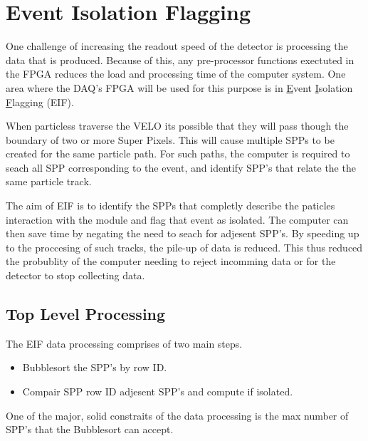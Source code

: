 \section{Event Isolation Flagging}
	
	One challenge of increasing the readout speed of the detector is processing the data that is produced.
	Because of this, any pre-processor functions exectuted in the FPGA reduces the load and processing time of the computer system.
	One area where the DAQ's FPGA will be used for this purpose is in \underline{E}vent \underline{I}solation \underline{F}lagging (EIF).
	\par
	When particless traverse the VELO its possible that they will pass though the boundary of two or more Super Pixels.
	This will cause multiple SPPs to be created for the same particle path.
	For such paths, the computer is required to seach all SPP corresponding to the event, and identify SPP's that relate the the same particle track.
	\par
	The aim of EIF is to identify the SPPs that completly describe the paticles interaction with the module and flag that event as isolated.
	The computer can then save time by negating the need to seach for adjesent SPP's.
	By speeding up to the proccesing of such tracks, the pile-up of data is reduced.
	This thus reduced the probublity of the computer needing to reject incomming data or for the detector to stop collecting data.

	\subsection{Top Level Processing} %
	\label{sub:top_level_processing}
	
		The EIF data processing comprises of two main steps.

		\begin{itemize}
			\item Bubblesort the SPP's by row ID.
			\item Compair SPP row ID adjesent SPP's and compute if isolated. 
		\end{itemize}

		One of the major, solid constraits of the data processing is the max number of SPP's that the Bubblesort can accept.
		



